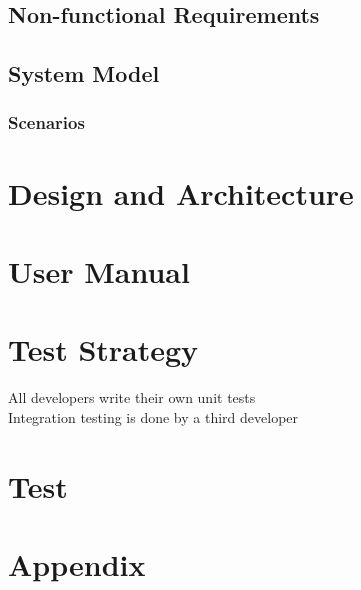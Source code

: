 \documentclass{report}
\begin{document}
\section{Non-functional Requirements}



\section{System Model}

\subsection{Scenarios}

\chapter{Design and Architecture}

\chapter{User Manual}

\chapter{Test Strategy}
All developers write their own unit tests \\
Integration testing is done by a third developer

\chapter{Test}

\chapter{Appendix}
\end{document}
